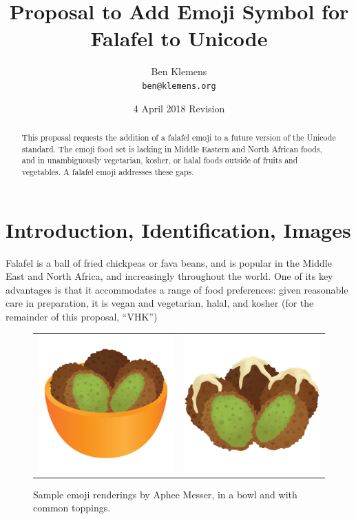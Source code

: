 \documentclass[a4paper,10pt]{article}
\begin{document}




\title{Proposal to Add Emoji Symbol for {\sc Falafel} to Unicode}
\author{Ben Klemens\\ {\tt ben@klemens.org}}
\date{4 April 2018 Revision}
\maketitle

\begin{abstract}
This proposal requests the addition of a {\sc falafel} emoji to a future version of the
Unicode standard.  The emoji food set is lacking in Middle Eastern and North African
foods, and in unambiguously vegetarian, kosher, or halal foods outside of fruits and
vegetables. A falafel emoji addresses these gaps.
\end{abstract}


\section{Introduction, Identification, Images}

{\sc Falafel} is a ball of fried chickpeas or fava beans, and is popular in the Middle East
and North Africa, and increasingly throughout the world.  One of its key advantages is
that it accommodates a range of food preferences: given reasonable care in preparation,
it is vegan and vegetarian, halal, and kosher (for the remainder of this proposal, ``VHK'')

\begin{figure}[h]
\begin{center}
\begin{tabular}{cc}
\includegraphics[width=2.2in]{falafel-bowl.png}& \includegraphics[width=2.2in]{falafel-tahini.png}
\end{tabular}
\end{center}
\caption{Sample emoji renderings by Aphee Messer, in a bowl and with common toppings.}
\label{apheefig}
\end{figure}
\end{document}
